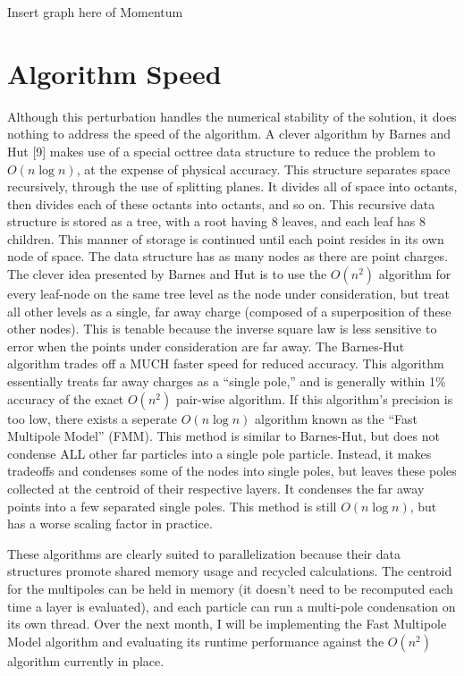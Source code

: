\documentclass[10pt]{article}
\begin{document}
Insert graph here of Momentum

\section{Algorithm Speed}
Although this perturbation handles the numerical stability of the solution, it does nothing to address the speed of the algorithm. A clever algorithm by Barnes and Hut [9] makes use of a special octtree data structure to reduce the problem to $O(n \log n)$, at the expense of physical accuracy. This structure separates space recursively, through the use of splitting planes. It divides all of space into octants, then divides each of these octants into octants, and so on. This recursive data structure is stored as a tree, with a root having 8 leaves, and each leaf has 8 children. This manner of storage is continued until each point resides in its own node of space. The data structure has as many nodes as there are point charges. The clever idea presented by Barnes and Hut is to use the $O(n^2)$ algorithm for every leaf-node on the same tree level as the node under consideration, but treat all other levels as a single, far away charge (composed of a superposition of these other nodes). This is tenable because the inverse square law is less sensitive to error when the points under consideration are far away. The Barnes-Hut algorithm trades off a MUCH faster speed for reduced accuracy. This algorithm essentially treats far away charges as a ``single pole,'' and is generally within 1\% accuracy of the exact $O(n^2)$ pair-wise algorithm. If this algorithm's precision is too low, there exists a seperate $O(n \log n)$ algorithm known as the ``Fast Multipole Model'' (FMM). This method is similar to Barnes-Hut, but does not condense ALL other far particles into a single pole particle. Instead, it makes tradeoffs and condenses some of the nodes into single poles, but leaves these poles collected at the centroid of their respective layers. It condenses the far away points into a few separated single poles. This method is still $O(n \log n)$, but has a worse scaling factor in practice.

These algorithms are clearly suited to parallelization because their data structures promote shared memory usage and recycled calculations. The centroid for the multipoles can be held in memory (it doesn't need to be recomputed each time a layer is evaluated), and each particle can run a multi-pole condensation on its own thread. Over the next month, I will be implementing the Fast Multipole Model algorithm and evaluating its runtime performance against the $O(n^2)$ algorithm currently in place.
\end{document}
